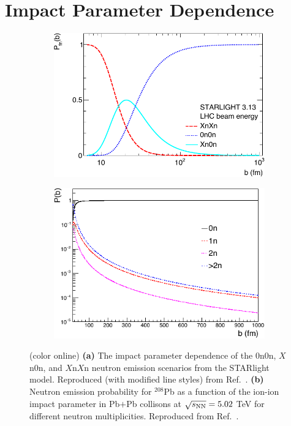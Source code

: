 \documentclass[12pt,epjc3]{svjour3}\sloppy
\begin{document}
\section{Impact Parameter Dependence}
\label{sec:impact}
\begin{figure}
    \centering
    \begin{subfigure}{.50\textwidth}
      \centering
      \includegraphics[width=.99\linewidth]{fig/fig_3-crop.pdf}
      \caption{}
    \end{subfigure}%
    \begin{subfigure}{.50\textwidth}
      \centering
      \includegraphics[width=.99\linewidth]{fig/fig_4-crop.pdf}
      \caption{}
    \end{subfigure}
    \caption{ (color online) \textbf{(a)} The impact parameter dependence of the $0$n$0$n, $X$n$0$n, and $X$n$X$n neutron emission scenarios from the STARlight model. Reproduced (with modified line styles) from Ref.~\cite{kleinPhotonuclearTwoPhotonInteractions2020}. \textbf{(b)} Neutron emission probability for $^{208}$Pb as a function of the ion-ion impact parameter in Pb$+$Pb collisons at $\sqrt{s_{\rm{NN}}} = 5.02$ TeV for different neutron multiplicities. Reproduced from Ref.~\cite{brandenburgAcoplanarityQEDPairs2020b}. 
    }
    \label{fig:neutron_theory}
\end{figure}
\end{document}
